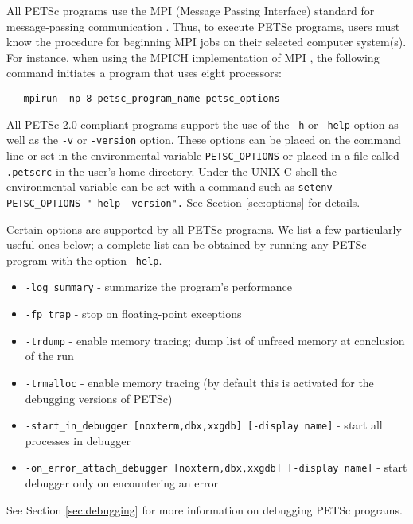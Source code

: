 {All PETSc programs use the MPI (Message Passing Interface) standard
for message-passing communication \cite{MPI-final}.  Thus, to execute
PETSc programs, users must know the procedure for beginning MPI jobs
on their selected computer system(s).  For instance, when using the
MPICH implementation of MPI \cite{mpich-web-page}, the following
command initiates a program that uses eight processors:
  
\begin{verbatim}
   mpirun -np 8 petsc_program_name petsc_options
\end{verbatim}


All PETSc 2.0-compliant programs support the use of the {\tt -h}
 or {\tt -help} option as well as the {\tt -v} 
or {\tt -version} option. These options can be placed on the
  command line or set in the
environmental variable {\tt PETSC\_OPTIONS} or placed in a file called
{\tt .petscrc} in the user's home directory.  Under the UNIX C shell
the environmental variable can be set 
 with a command such as {\tt setenv PETSC\_OPTIONS
"-help -version".}  See Section \ref{sec:options} for details.


Certain options are supported by all PETSc programs.  We list a few 
particularly useful ones below; a complete list can be obtained by 
running any PETSc program with the option {\tt -help}.
\begin{itemize}
\item {\tt -log\_summary} - summarize the program's performance
\item {\tt -fp\_trap} - stop on floating-point exceptions 
\item {\tt -trdump} - enable memory tracing; dump list of unfreed memory 
      at conclusion  of the run
\item {\tt -trmalloc} - enable memory tracing (by default this is 
      activated for the debugging versions of PETSc)
\item {\tt -start\_in\_debugger [noxterm,dbx,xxgdb] [-display name]} 
     - start all processes in debugger
\item {\tt -on\_error\_attach\_debugger [noxterm,dbx,xxgdb]
      [-display name]} - start debugger only on encountering an error
\end{itemize}
See Section \ref{sec:debugging} for more information on debugging PETSc programs.

}
